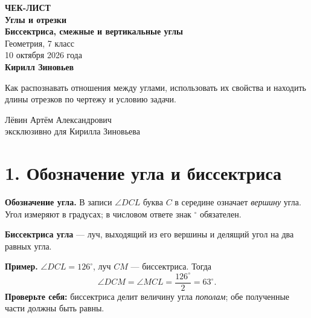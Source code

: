\documentclass[a4paper,12pt]{article}
\newcommand{\headingrule}{\vspace{-0.45em}{\color{accent}\hrule height 0.55pt}\vspace{0.55em}}
\newcommand{\key}[1]{\textbf{\color{darkaccent}#1}}
\begin{document}
\thispagestyle{empty}
\begin{center}
\vspace*{22mm}
{\Large\color{darkaccent}\bfseries ЧЕК-ЛИСТ}\\[9mm]
{\huge\bfseries Углы и отрезки}\\[3mm]
{\LARGE\bfseries Биссектриса, смежные и вертикальные углы}\\[10mm]
{\large Геометрия, 7 класс}\\[3mm]
{\large 10 октября 2026 года}\\[17mm]
{\large\bfseries Кирилл Зиновьев}\\[12mm]
\begin{minipage}{0.79\textwidth}
\centering\normalsize
Как распознавать отношения между углами, использовать их свойства
и находить длины отрезков по чертежу и условию задачи.
\end{minipage}
\vfill
{\large Лёвин Артём Александрович}\\[2mm]
{\normalsize эксклюзивно для Кирилла Зиновьева}\\[11mm]
\end{center}
\clearpage

\section*{1. Обозначение угла и биссектриса}
\headingrule
\key{Обозначение угла.} В записи $\angle DCL$ буква $C$ в середине означает \emph{вершину} угла. Угол измеряют в градусах; в числовом ответе знак $^\circ$ обязателен.

\key{Биссектриса угла} --- луч, выходящий из его вершины и делящий угол на два равных угла.

\begin{center}
\end{center}
\textbf{Пример.} $\angle DCL=126^\circ$, луч $CM$ --- биссектриса.
Тогда
\[
\angle DCM=\angle MCL=\frac{126^\circ}{2}=63^\circ.
\]
\key{Проверьте себя:} биссектриса делит величину угла \emph{пополам}; обе полученные части должны быть равны.
\end{document}
